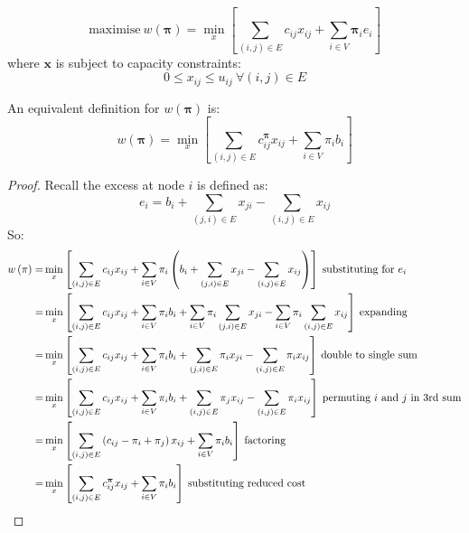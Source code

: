 \begin{equation} \label{eq:relax-obj-fun-excess}
\mathrm{maximise}\: w\left(\boldsymbol{\pi}\right)=\min_{x}\left[\sum_{\left(i,j\right)\in E}c_{ij}x_{ij}+\sum_{i\in V}\boldsymbol{\pi}_{i}e_{i}\right]
\end{equation}
where $\mathbf{x}$ is subject to capacity constraints:
\begin{equation} \label{eq:relax-capacity-constraints}
0\leq x_{ij}\leq u_{ij}\:\forall\left(i,j\right)\in E
\end{equation}

\begin{lemma}
An equivalent definition for $w(\boldsymbol{\pi})$ is:
\begin{equation} \label{eq:relax-obj-fun-balance}
w(\boldsymbol{\pi})=\min_{x}\left[\sum_{\left(i,j\right)\in E}c_{ij}^{\boldsymbol{\pi}}x_{ij}+\sum_{i\in V}\pi_{i}b_{i}\right]
\end{equation}
\end{lemma}
\begin{proof}
Recall the excess at node $i$ is defined as:
\[e_{i}=b_{i}+\sum_{(j,i)\in E}x_{ji}-\sum_{(i,j)\in E}x_{ij}\]
So:
\begin{align*}
w\left(\pi\right)= & \min_{x}\left[\sum_{\left(i,j\right)\in E}c_{ij}x_{ij}+\sum_{i\in V}\pi_{i}\left(b_{i}+\sum_{(j,i)\in E}x_{ji}-\sum_{(i,j)\in E}x_{ij}\right)\right]\:\mbox{substituting for }e_{i}\\
= & \min_{x}\left[\sum_{\left(i,j\right)\in E}c_{ij}x_{ij}+\sum_{i\in V}\pi_{i}b_{i}+\sum_{i\in V}\pi_{i}\sum_{(j,i)\in E}x_{ji}-\sum_{i\in V}\pi_{i}\sum_{(i,j)\in E}x_{ij}\right]\:\mbox{expanding}\\
= & \min_{x}\left[\sum_{\left(i,j\right)\in E}c_{ij}x_{ij}+\sum_{i\in V}\pi_{i}b_{i}+\sum_{(j,i)\in E}\pi_{i}x_{ji}-\sum_{(i,j)\in E}\pi_{i}x_{ij}\right]\:\mbox{double to single sum}\\
= & \min_{x}\left[\sum_{\left(i,j\right)\in E}c_{ij}x_{ij}+\sum_{i\in V}\pi_{i}b_{i}+\sum_{(i,j)\in E}\pi_{j}x_{ij}-\sum_{(i,j)\in E}\pi_{i}x_{ij}\right]\:\mbox{permuting \ensuremath{i} and \ensuremath{j} in 3rd sum}\\
= & \min_{x}\left[\sum_{\left(i,j\right)\in E}\left(c_{ij}-\pi_{i}+\pi_{j}\right)x_{ij}+\sum_{i\in V}\pi_{i}b_{i}\right]\:\mbox{factoring}\\
= & \min_{x}\left[\sum_{\left(i,j\right)\in E}c_{ij}^{\boldsymbol{\pi}}x_{ij}+\sum_{i\in V}\pi_{i}b_{i}\right]\:\mbox{substituting reduced cost}
\end{align*}
\end{proof}

